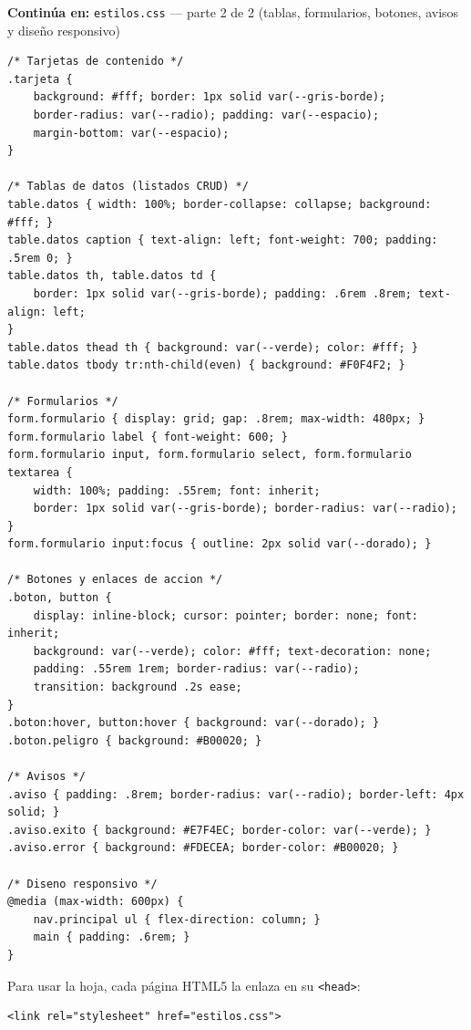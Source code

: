 {\small\textbf{Continúa en:} \texttt{estilos.css} --- parte 2 de 2 (tablas, formularios, botones, avisos y diseño responsivo)}
\begin{lstlisting}[style=css,caption={estilos.css --- parte 2: tablas, formularios, botones y responsivo},label={lst:estilos-base-b}]
/* Tarjetas de contenido */
.tarjeta {
    background: #fff; border: 1px solid var(--gris-borde);
    border-radius: var(--radio); padding: var(--espacio);
    margin-bottom: var(--espacio);
}

/* Tablas de datos (listados CRUD) */
table.datos { width: 100%; border-collapse: collapse; background: #fff; }
table.datos caption { text-align: left; font-weight: 700; padding: .5rem 0; }
table.datos th, table.datos td {
    border: 1px solid var(--gris-borde); padding: .6rem .8rem; text-align: left;
}
table.datos thead th { background: var(--verde); color: #fff; }
table.datos tbody tr:nth-child(even) { background: #F0F4F2; }

/* Formularios */
form.formulario { display: grid; gap: .8rem; max-width: 480px; }
form.formulario label { font-weight: 600; }
form.formulario input, form.formulario select, form.formulario textarea {
    width: 100%; padding: .55rem; font: inherit;
    border: 1px solid var(--gris-borde); border-radius: var(--radio);
}
form.formulario input:focus { outline: 2px solid var(--dorado); }

/* Botones y enlaces de accion */
.boton, button {
    display: inline-block; cursor: pointer; border: none; font: inherit;
    background: var(--verde); color: #fff; text-decoration: none;
    padding: .55rem 1rem; border-radius: var(--radio);
    transition: background .2s ease;
}
.boton:hover, button:hover { background: var(--dorado); }
.boton.peligro { background: #B00020; }

/* Avisos */
.aviso { padding: .8rem; border-radius: var(--radio); border-left: 4px solid; }
.aviso.exito { background: #E7F4EC; border-color: var(--verde); }
.aviso.error { background: #FDECEA; border-color: #B00020; }

/* Diseno responsivo */
@media (max-width: 600px) {
    nav.principal ul { flex-direction: column; }
    main { padding: .6rem; }
}
\end{lstlisting}

Para usar la hoja, cada página HTML5 la enlaza en su \texttt{<head>}:

\begin{lstlisting}[style=html,caption={Enlace de la hoja base en cualquier pagina},label={lst:estilos-enlace}]
<link rel="stylesheet" href="estilos.css">
\end{lstlisting}

